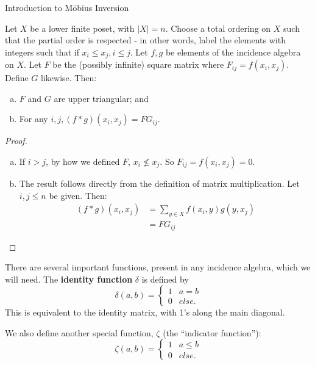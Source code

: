 \documentclass[12pt]{pom_thesis}
\begin{document}
\begin{chapter}{Introduction to M\"obius Inversion}
\begin{lemma}\label{mat_eq}
Let $X$ be a lower finite poset, with $|X|=n$. Choose a total ordering on $X$ such that the partial order is respected - in other words, label the elements with integers such that if $x_i \leq x_j, i \leq j$. Let $f,g$ be elements of the incidence algebra on $X$. Let $F$ be the (possibly infinite) square matrix where $F_{ij}=f(x_i, x_j)$. Define $G$ likewise. Then:
\begin{enumerate}[a)]
\item $F$ and $G$ are upper triangular; and
\item For any $i,j, (f * g)(x_i, x_j)=FG_{ij}$.
\end{enumerate}
\end{lemma}
\begin{proof}
\begin{enumerate}[a)]
\item If $i>j$, by how we defined $F$, $x_i \nleq x_j$. So $F_{ij} = f(x_i, x_j) = 0$. 
\item
The result follows directly from the definition of matrix multiplication. Let $i,j\leq n$ be given. Then:
\begin{align*}
(f * g)(x_i, x_j) &= \sum_{y \in X} f(x_i,y)g(y,x_j)\\
&=FG_{ij}
\end{align*}
\end{enumerate}
\end{proof}


There are several important functions, present in any incidence algebra, which we will need. 
The \textbf{identity function} $\delta$ is defined by 
\[\delta(a,b) = \begin{cases} 1 & a = b \\ 0 & else. \end{cases}
\]
This is equivalent to the identity matrix, with 1's along the main diagonal.

We also define another special function, $\zeta$ (the ``indicator function''):
\[
\zeta(a,b) = \begin{cases} 1 & a \leq b \\ 0 & else. \end{cases}
\]


\end{chapter}
\end{document}
